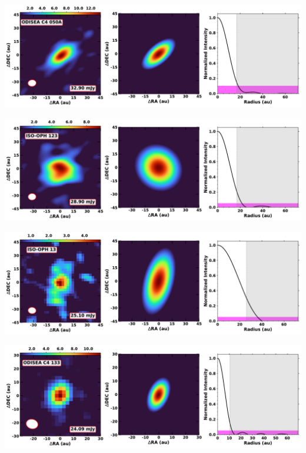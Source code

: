 \vspace{0pt}
\begin{minipage}{.49\textwidth}
	 \centering
	 	 \hrulesep
	 	 \includegraphics[width=1\linewidth]{pdf/0+II/039_odisea_c4_050a_cutout.pdf}
\end{minipage}%
\vrulesep
\begin{minipage}{.49\textwidth}
	 \centering
	 	 \hrulesep
	 	 \includegraphics[width=1\linewidth]{pdf/0+II/036_iso-oph_123_cutout.pdf}
\end{minipage}%
\vspace{0pt}
\begin{minipage}{.49\textwidth}
	 \centering
	 	 \hrulesep
	 	 \includegraphics[width=1\linewidth]{pdf/0+II/033_iso-oph_13_cutout.pdf}
\end{minipage}%
\vrulesep
\begin{minipage}{.49\textwidth}
	 \centering
	 	 \hrulesep
	 	 \includegraphics[width=1\linewidth]{pdf/0+II/032_odisea_c4_133_cutout.pdf}
\end{minipage}%
